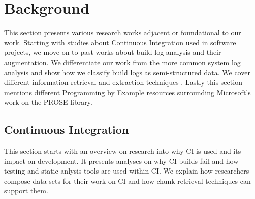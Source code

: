 \documentclass[\myrootdir/main.tex]{subfiles}
\begin{document}
\chapter{Background}
\label{sec:rw}
This section presents various research works adjacent or foundational to our work.
Starting with studies about Continuous Integration used in software projects, we move on to past works about build log analysis and their augmentation.
We differentiate our work from the more common system log analysis and show how we classify build logs as semi-structured data.
We cover different information retrieval and extraction techniques .
Lastly this section mentions different Programming by Example resources surrounding Microsoft's work on the PROSE library.

\section{Continuous Integration}
This section starts with an overview on research into why CI is used and its impact on development.
It presents analyses on why CI builds fail and how testing and static anlysis tools are used within CI.
We explain how researchers compose data sets for their work on CI and how chunk retrieval techniques can support them.
\end{document}
